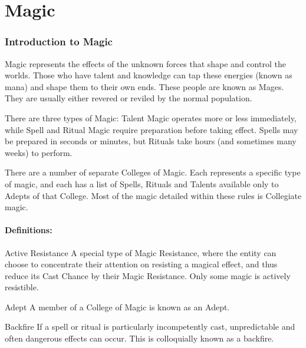 \chapter{Magic}

\begin{multicols*}{3}

\label{magic}

\subsection{Introduction to Magic}
\label{magic:intro}

Magic represents the effects of the unknown forces that shape and
control the worlds. Those who have talent and knowledge can tap these
energies (known as mana) and shape them to their own ends. These
people are known as Mages. They are usually either revered or reviled
by the normal population.

There are three types of Magic: Talent Magic operates more or less
immediately, while Spell and Ritual Magic require preparation before
taking effect. Spells may be prepared in seconds or minutes, but
Rituals take hours (and sometimes many weeks) to perform.

There are a number of separate Colleges of Magic. Each represents a
specific type of magic, and each has a list of Spells, Rituals and
Talents available only to Adepts of that College. Most of the magic
detailed within these rules is Collegiate magic.

\subsubsection{Definitions:}

\begin{Description}

\item[Active Resistance] A special type of Magic Resistance, where the
entity can choose to concentrate their attention on resisting a
magical effect, and thus reduce its Cast Chance by their Magic
Resistance. Only some magic is actively resistible.

\item[Adept] A member of a College of Magic is known as an Adept.

\item[Backfire] If a spell or ritual is particularly incompetently
cast, unpredictable and often dangerous effects can occur. This is
colloquially known as a backfire.


\end{Description}
\end{multicols*}
